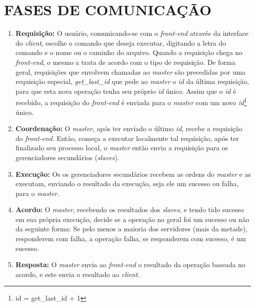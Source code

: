 \documentclass[12pt,a4paper]{article}
\begin{document}
	\section{\normalsize FASES DE COMUNICAÇÃO}
		\begin{enumerate}
			\item \textbf{Requisição:} O usuário, comunicando-se com o \textit{front-end} através da interface do \textit{client}, escolhe o comando que deseja executar, digitando a letra do comando e o nome ou o caminho do arquivo. Quando a requisição chega no \textit{front-end}, o mesmo a trata de acordo com o tipo de requisição. De forma geral, requisições que envolvem chamadas ao \textit{master} são precedidas por uma requisição especial, \textit{get\_last\_id} que pede ao \textit{master} o \textit{id} da última requisição, para que esta nova operação tenha seu próprio \textit{id} único. Assim que o \textit{id} é recebido, a requisição do \textit{front-end} é enviada para o \textit{master} com um novo \textit{id}\footnote{id = get\_last\_id + 1} único.
			
			\item \textbf{Coordenação:} O \textit{master}, após ter enviado o último \textit{id}, recebe a requisição do \textit{front-end}. Então, começa a executar localmente tal requisição, após ter finalizado seu processo local, o \textit{master} então envia a requisição para os gerenciadores secundários (\textit{slaves}).
			
			\item \textbf{Execução:} Os os gerenciadores secundários recebem as ordens do \textit{master} e as executam, enviando o resultado da execução, seja ele um sucesso ou falha, para o \textit{master}.
			
			\item \textbf{Acordo:} O \textit{master}, recebendo os resultados dos \textit{slaves}, e tendo tido sucesso em sua própria execução, decide se a operação no geral foi um sucesso ou não da seguinte forma: Se pelo menos a maioria dos servidores (mais da metade), responderem com falha, a operação falha, se responderem com sucesso, é um sucesso.
			
			\item \textbf{Resposta:} O \textit{master} envia ao \textit{front-end} o resultado da operação baseada no acordo, e este envia o resultado ao \textit{client}. 
		\end{enumerate}
\end{document}
